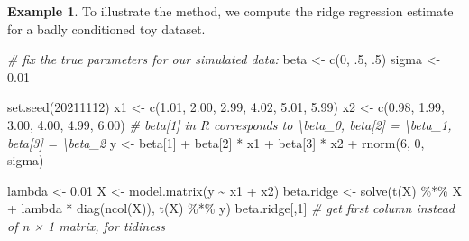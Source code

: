 \documentclass[
  a4paper,
]{article}
\newenvironment{Shaded}{\begin{snugshade}}{\end{snugshade}}
\newcommand{\CommentTok}[1]{\textcolor[rgb]{0.56,0.35,0.01}{\textit{#1}}}
\newcommand{\DecValTok}[1]{\textcolor[rgb]{0.00,0.00,0.81}{#1}}
\newcommand{\FloatTok}[1]{\textcolor[rgb]{0.00,0.00,0.81}{#1}}
\newcommand{\FunctionTok}[1]{\textcolor[rgb]{0.00,0.00,0.00}{#1}}
\newcommand{\NormalTok}[1]{#1}
\newcommand{\OtherTok}[1]{\textcolor[rgb]{0.56,0.35,0.01}{#1}}
\newcommand{\SpecialCharTok}[1]{\textcolor[rgb]{0.00,0.00,0.00}{#1}}
\theoremstyle{definition}
\theoremstyle{definition}
\newtheorem{example}{Example}[section]
\theoremstyle{definition}
\theoremstyle{definition}
\theoremstyle{remark}
\begin{document}
\begin{example}
\protect\hypertarget{exm:knorkel}{}\label{exm:knorkel}To illustrate the method, we compute the ridge regression estimate for
a badly conditioned toy dataset.

\begin{Shaded}
\begin{Highlighting}[]
\CommentTok{\# fix the true parameters for our simulated data:}
\NormalTok{beta }\OtherTok{\textless{}{-}} \FunctionTok{c}\NormalTok{(}\DecValTok{0}\NormalTok{, .}\DecValTok{5}\NormalTok{, .}\DecValTok{5}\NormalTok{)}
\NormalTok{sigma }\OtherTok{\textless{}{-}} \FloatTok{0.01}

\FunctionTok{set.seed}\NormalTok{(}\DecValTok{20211112}\NormalTok{)}
\NormalTok{x1 }\OtherTok{\textless{}{-}} \FunctionTok{c}\NormalTok{(}\FloatTok{1.01}\NormalTok{, }\FloatTok{2.00}\NormalTok{, }\FloatTok{2.99}\NormalTok{, }\FloatTok{4.02}\NormalTok{, }\FloatTok{5.01}\NormalTok{, }\FloatTok{5.99}\NormalTok{)}
\NormalTok{x2 }\OtherTok{\textless{}{-}} \FunctionTok{c}\NormalTok{(}\FloatTok{0.98}\NormalTok{, }\FloatTok{1.99}\NormalTok{, }\FloatTok{3.00}\NormalTok{, }\FloatTok{4.00}\NormalTok{, }\FloatTok{4.99}\NormalTok{, }\FloatTok{6.00}\NormalTok{)}
\CommentTok{\# beta[1] in R corresponds to \textbackslash{}beta\_0, beta[2] = \textbackslash{}beta\_1, beta[3] = \textbackslash{}beta\_2}
\NormalTok{y }\OtherTok{\textless{}{-}}\NormalTok{ beta[}\DecValTok{1}\NormalTok{] }\SpecialCharTok{+}\NormalTok{ beta[}\DecValTok{2}\NormalTok{] }\SpecialCharTok{*}\NormalTok{ x1 }\SpecialCharTok{+}\NormalTok{ beta[}\DecValTok{3}\NormalTok{] }\SpecialCharTok{*}\NormalTok{ x2 }\SpecialCharTok{+} \FunctionTok{rnorm}\NormalTok{(}\DecValTok{6}\NormalTok{, }\DecValTok{0}\NormalTok{, sigma)}

\NormalTok{lambda }\OtherTok{\textless{}{-}} \FloatTok{0.01}
\NormalTok{X }\OtherTok{\textless{}{-}} \FunctionTok{model.matrix}\NormalTok{(y }\SpecialCharTok{\textasciitilde{}}\NormalTok{ x1 }\SpecialCharTok{+}\NormalTok{ x2)}
\NormalTok{beta.ridge }\OtherTok{\textless{}{-}} \FunctionTok{solve}\NormalTok{(}\FunctionTok{t}\NormalTok{(X) }\SpecialCharTok{\%*\%}\NormalTok{ X }\SpecialCharTok{+}\NormalTok{ lambda }\SpecialCharTok{*} \FunctionTok{diag}\NormalTok{(}\FunctionTok{ncol}\NormalTok{(X)), }\FunctionTok{t}\NormalTok{(X) }\SpecialCharTok{\%*\%}\NormalTok{ y)}
\NormalTok{beta.ridge[,}\DecValTok{1}\NormalTok{] }\CommentTok{\# get first column instead of n × 1 matrix, for tidiness}
\end{Highlighting}
\end{Shaded}


\end{example}
\end{document}
